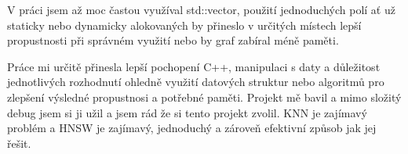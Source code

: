 \documentclass[czech,semestral,dept460,male,csharp,cpdeclaration]{diploma}
\begin{document}
		V práci jsem až moc častou využíval std::vector, použití jednoduchých polí ať už staticky nebo dynamicky alokovaných by přineslo v určitých místech lepší propustnosti při správném využití nebo by graf zabíral méně paměti.
		
		Práce mi určitě přinesla lepší pochopení C++, manipulaci s daty a důležitost jednotlivých rozhodnutí ohledně využití datových struktur nebo algoritmů pro zlepšení výsledné propustnosi a potřebné paměti. Projekt mě bavil a mimo složitý debug jsem si ji užil a jsem rád že si tento projekt zvolil. KNN je zajímavý problém a HNSW je zajímavý, jednoduchý a zároveň efektivní způsob jak jej řešit.
	
	\nocite{*}
	
	\printbibliography[title={Literatura}, heading=bibintoc]
	
\end{document}
